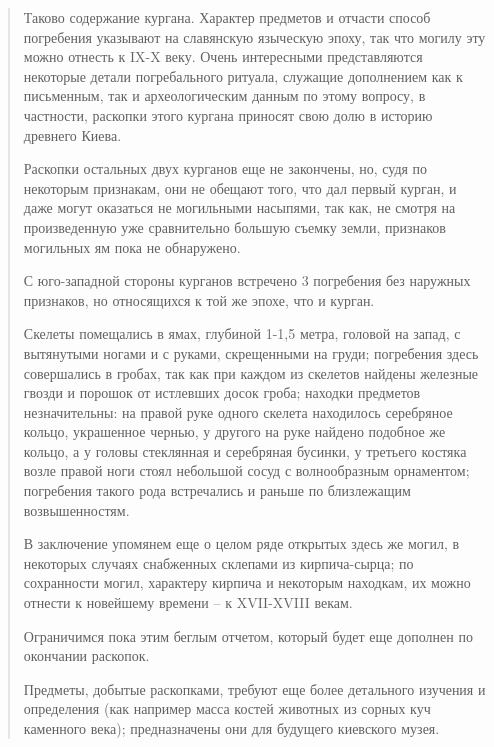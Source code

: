 \begin{quotation}
Таково содержание кургана. Характер предметов и отчасти способ погребения указывают на славянскую языческую эпоху, так что могилу эту можно отнесть к IX-X веку. Очень интересными представляются некоторые детали погребального ритуала, служащие дополнением как к письменным, так и археологическим данным по этому вопросу, в частности, раскопки этого кургана приносят свою долю в историю древнего Киева.

Раскопки остальных двух курганов еще не закончены, но, судя по некоторым признакам, они не обещают того, что дал первый курган, и даже могут оказаться не могильными насыпями, так как, не смотря на произведенную уже сравнительно большую съемку земли, признаков могильных ям пока не обнаружено.

С юго-западной стороны курганов встречено 3 погребения без наружных признаков, но относящихся к той же эпохе, что и курган.

Скелеты помещались в ямах, глубиной 1-1,5 метра, головой на запад, с вытянутыми ногами и с руками, скрещенными на груди; погребения здесь совершались в гробах, так как при каждом из скелетов найдены железные гвозди и порошок от истлевших досок гроба; находки предметов незначительны: на правой руке одного скелета находилось серебряное кольцо, украшенное чернью, у другого на руке найдено подобное же кольцо, а у головы стеклянная и серебряная бусинки, у третьего костяка возле правой ноги стоял небольшой сосуд с волнообразным орнаментом; погребения такого рода встречались и раньше по близлежащим возвышенностям.

В заключение упомянем еще о целом ряде открытых здесь же могил, в некоторых случаях снабженных склепами из кирпича-сырца; по сохранности могил, характеру кирпича и некоторым находкам, их можно отнести к новейшему времени – к XVII-XVIII векам.

Ограничимся пока этим беглым отчетом, который будет еще дополнен по окончании раскопок.

Предметы, добытые раскопками, требуют еще более детального изучения и определения (как например масса костей животных из сорных куч каменного века); предназначены они для будущего киевского музея.
\end{quotation}



